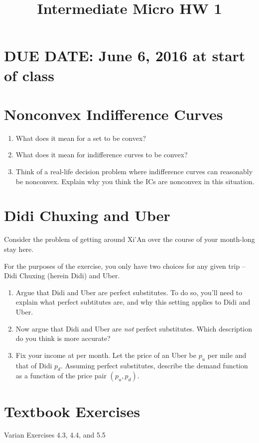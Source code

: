 \documentclass{article}
\begin{document}
\title{Intermediate Micro HW 1}

\maketitle

\section*{DUE DATE: June 6, 2016 at start of class}

\section{Nonconvex Indifference Curves}

\begin{enumerate}
\item What does it mean for a set to be convex?
\item What does it mean for indifference curves to be convex?
\item Think of a real-life decision problem where indifference curves can reasonably be nonconvex. Explain why you think the ICs are nonconvex in this situation.
\end{enumerate}

\section{Didi Chuxing and Uber}
Consider the problem of getting around Xi'An over the course of your month-long stay here.

For the purposes of the exercise, you only have two choices for any given trip -- Didi Chuxing (herein Didi) and Uber. 

\begin{enumerate}
\item Argue that Didi and Uber are perfect substitutes. To do so, you'll need to explain what perfect subtitutes are, and why this setting applies to Didi and Uber.
\item Now argue that Didi and Uber are \textit{not} perfect substitutes. Which description do you think is more accurate? 
\item Fix your income at  per month. Let the price of an Uber be $p_u$ per mile and that of Didi $p_d$. Assuming perfect substitutes, describe the demand function as a function of the price pair $(p_u, p_d)$.
\end{enumerate}

\section{Textbook Exercises}

Varian Exercises 4.3, 4.4, and 5.5
\end{document}
